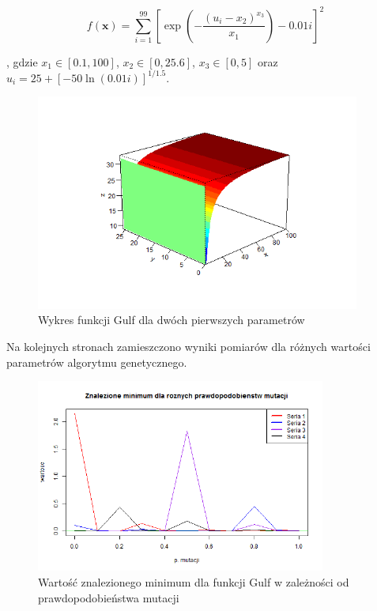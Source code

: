 \documentclass[11pt, a4paper]{article}
\newcommand{\fbi}{\leavevmode{\parindent=1em\indent}}
\begin{document}
\begin{equation}\label{eq:gulf}
f(\boldsymbol{x}) = \sum_{i=1}^{99} [\exp(- \frac{(u_i - x_2)^{x_3}}{x_1}) - 0.01i]^2
\end{equation}

, gdzie $ x_1 \in [0.1, 100] $, $ x_2 \in [0, 25.6] $, $ x_3 \in [0, 5] $ oraz $ u_i = 25 + [-50 \ln (0.01i)]^{1/1.5} $.

\begin{figure}[H]
	\begin{center}
		\includegraphics[width=0.95\textwidth]{./assets/Gulf1.png}
		\caption{Wykres funkcji Gulf dla dwóch pierwszych parametrów}
		\label{fig:gulf1}
	\end{center}
\end{figure}

\fbi
Na kolejnych stronach zamieszczono wyniki pomiarów dla różnych wartości parametrów algorytmu genetycznego.

\begin{figure}[H]
	\begin{center}
		\includegraphics[width=0.85\textwidth]{./assets/Gulf2.png}
		\caption{Wartość znalezionego minimum dla funkcji Gulf w zależności od prawdopodobieństwa mutacji}
		\label{fig:gulf2}
	\end{center}
\end{figure}
\end{document}
